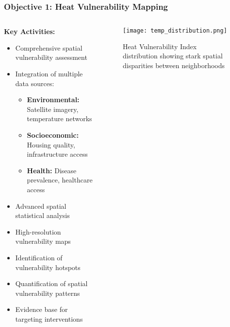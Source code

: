 \documentclass[aspectratio=169]{beamer}
\newcommand{\concept}[1]{\textcolor{witsteal}{\textbf{#1}}}
\begin{document}
\begin{frame}
    \frametitle{Objective 1: Heat Vulnerability Mapping}
    
    \begin{columns}[T]
        \begin{column}{0.55\textwidth}
            \textbf{\large Key Activities:}
            \begin{itemize}[leftmargin=*, itemsep=6pt]
                \item Comprehensive spatial vulnerability assessment
                \item Integration of multiple data sources:
                \begin{itemize}[itemsep=4pt]
                    \item \concept{Environmental:} Satellite imagery, temperature networks
                    \item \concept{Socioeconomic:} Housing quality, infrastructure access
                    \item \concept{Health:} Disease prevalence, healthcare access
                \end{itemize}
                \item Advanced spatial statistical analysis
            \end{itemize}
            
            \vspace{-0.2cm} %
            \begin{impactbox}
                \begin{itemize}[leftmargin=*, itemsep=6pt]
                    \item High-resolution vulnerability maps
                    \item Identification of vulnerability hotspots
                    \item Quantification of spatial vulnerability patterns
                    \item Evidence base for targeting interventions
                \end{itemize}
            \end{impactbox}
        \end{column}
        \begin{column}{0.42\textwidth}
            \begin{figure}
                \texttt{[image: temp\_distribution.png]}
                \caption{\small Heat Vulnerability Index distribution showing stark spatial disparities between neighborhoods}
            \end{figure}
        \end{column}
    \end{columns}
\end{frame}
\end{document}
